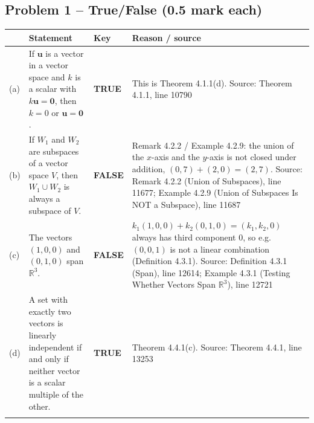 \documentclass[11pt,a4paper]{article}
\newcommand{\Src}[1]{{\footnotesize\color{black!65}Source: #1}}
\begin{document}
\subsection*{Problem 1 -- True/False (0.5 mark each)}
\begin{tabularx}{\linewidth}{@{}l >{\raggedright\arraybackslash}X l >{\raggedright\arraybackslash}X@{}}\toprule & Statement & Key & Reason / source\\\midrule
(a) & If $\mathbf{u}$ is a vector in a vector space and $k$ is a scalar with $k\mathbf{u}=\mathbf{0}$, then $k=0$ or $\mathbf{u}=\mathbf{0}$. & \textbf{TRUE} & This is Theorem 4.1.1(d). \Src{Theorem 4.1.1, line 10790}\\\addlinespace
(b) & If $W_1$ and $W_2$ are subspaces of a vector space $V$, then $W_1\cup W_2$ is always a subspace of $V$. & \textbf{FALSE} & Remark 4.2.2 / Example 4.2.9: the union of the $x$-axis and the $y$-axis is not closed under addition, $(0,7)+(2,0)=(2,7)$. \Src{Remark 4.2.2 (Union of Subspaces), line 11677; Example 4.2.9 (Union of Subspaces Is NOT a Subspace), line 11687}\\\addlinespace
(c) & The vectors $(1,0,0)$ and $(0,1,0)$ span $\mathbb{R}^3$. & \textbf{FALSE} & $k_1(1,0,0)+k_2(0,1,0)=(k_1,k_2,0)$ always has third component $0$, so e.g. $(0,0,1)$ is not a linear combination (Definition 4.3.1). \Src{Definition 4.3.1 (Span), line 12614; Example 4.3.1 (Testing Whether Vectors Span $\mathbb{R}^3$), line 12721}\\\addlinespace
(d) & A set with exactly two vectors is linearly independent if and only if neither vector is a scalar multiple of the other. & \textbf{TRUE} & Theorem 4.4.1(c). \Src{Theorem 4.4.1, line 13253}\\\addlinespace
\bottomrule\end{tabularx}
\end{document}

